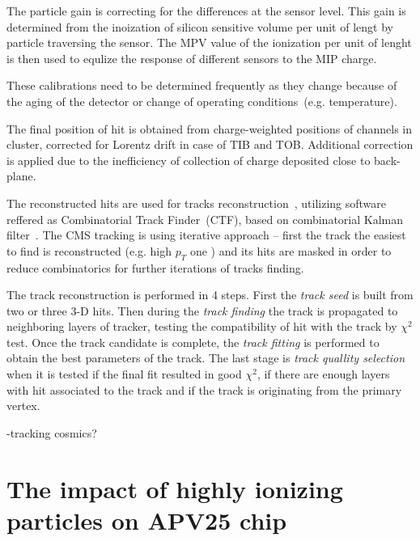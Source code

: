 The particle gain is correcting for the differences at the sensor level. This gain is determined from the inoization of silicon sensitive volume per unit of lengt by particle traversing the sensor. The MPV value of the ionization per unit of lenght is then used to equlize the response of different sensors to the MIP charge. 

These calibrations need to be determined frequently as they change because of the aging of the detector or change of operating conditions~(e.g. temperature).

The final position of hit is obtained from charge-weighted positions of channels in cluster, corrected for Lorentz drift in case of TIB and TOB. Additional correction is applied due to the inefficiency of collection of charge deposited close to back-plane.

The reconstructed hits are used for tracks reconstruction~\cite{Chatrchyan:2014fea}, utilizing software reffered as Combinatorial Track Finder~(CTF), based on combinatorial Kalman filter~\cite{Fruhwirth:1987fm}. The CMS tracking is using iterative approach -- first the track the easiest to find is reconstructed (e.g. high $p_{T}$ one ) and its hits are masked in order to reduce combinatorics for further iterations of tracks finding.


The track reconstruction is performed in 4 steps. First the \textit{track seed} is built from two or three 3-D hits. Then during the \textit{track finding} the track is propagated to neighboring layers of tracker, testing the compatibility of hit with the track by $\chi^{2}$ test. Once the track candidate is complete, the \textit{track fitting} is performed to obtain the best parameters of the track. The last stage is \textit{track quallity selection} when it is tested if the final fit resulted in good $\chi^{2}$, if there are enough layers with hit associated to the track and if the track is originating from the primary vertex.

-tracking cosmics?

\section{The impact of highly ionizing particles on APV25 chip}



